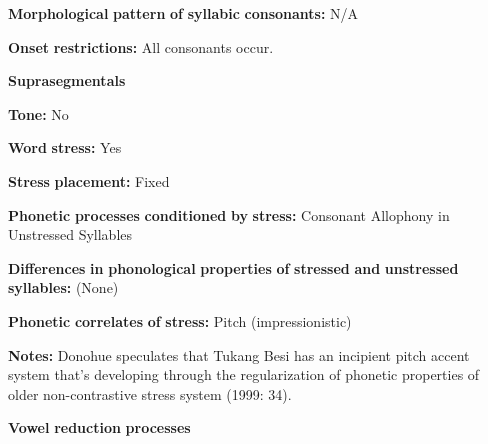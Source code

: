 \begin{styleBody}
\textbf{Morphological} \textbf{pattern} \textbf{of} \textbf{syllabic} \textbf{consonants:} N/A
\end{styleBody}

\begin{styleBody}
\textbf{Onset} \textbf{restrictions:} All consonants occur.
\end{styleBody}

\begin{styleBody}
\textbf{Suprasegmentals}
\end{styleBody}

\begin{styleBody}
\textbf{Tone:} No
\end{styleBody}

\begin{styleBody}
\textbf{Word} \textbf{stress:} Yes
\end{styleBody}

\begin{styleBody}
\textbf{Stress} \textbf{placement:} Fixed
\end{styleBody}

\begin{styleBody}
\textbf{Phonetic} \textbf{processes} \textbf{conditioned} \textbf{by} \textbf{stress:} Consonant Allophony in Unstressed Syllables
\end{styleBody}

\begin{styleBody}
\textbf{Differences} \textbf{in} \textbf{phonological} \textbf{properties} \textbf{of} \textbf{stressed} \textbf{and} \textbf{unstressed} \textbf{syllables:} (None)
\end{styleBody}

\begin{styleBody}
\textbf{Phonetic} \textbf{correlates} \textbf{of} \textbf{stress:} Pitch (impressionistic)
\end{styleBody}

\begin{styleBody}
\textbf{Notes:} Donohue speculates that Tukang Besi has an incipient pitch accent system that’s developing through the regularization of phonetic properties of older non-contrastive stress system (1999: 34).
\end{styleBody}

\begin{styleBody}
\textbf{Vowel} \textbf{reduction} \textbf{processes}
\end{styleBody}

